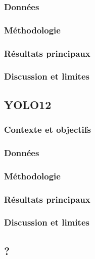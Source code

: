 \subsubsection{Données}

\subsubsection{Méthodologie}

\subsubsection{Résultats principaux}

\subsubsection{Discussion et limites}


\subsection{YOLO12}

\subsubsection{Contexte et objectifs}

\subsubsection{Données}

\subsubsection{Méthodologie}

\subsubsection{Résultats principaux}

\subsubsection{Discussion et limites}

\subsection{?}

